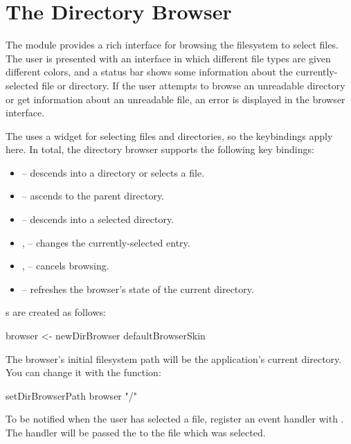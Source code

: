 \section{The Directory Browser}
\label{sec:dirbrowser}

The  module provides a rich interface for browsing the
filesystem to select files.  The user is presented with an interface
in which different file types are given different colors, and a status
bar shows some information about the currently-selected file or
directory.  If the user attempts to browse an unreadable directory or
get information about an unreadable file, an error is displayed in the
browser interface.

The  uses a  widget for selecting files and
directories, so the  keybindings apply here.  In total, the
directory browser supports the following key bindings:

\begin{itemize}
\item {} -- descends into a directory or selects a file.
\item {} -- ascends to the parent directory.
\item {} -- descends into a selected directory.
\item {},  -- changes the currently-selected entry.
\item {},  -- cancels browsing.
\item {} -- refreshes the browser's state of the current
  directory.
\end{itemize}

s are created as follows:

\begin{haskellcode}
 browser <- newDirBrowser defaultBrowserSkin
\end{haskellcode}

The browser's initial filesystem path will be the application's
current directory.  You can change it with the 
function:

\begin{haskellcode}
 setDirBrowserPath browser "/"
\end{haskellcode}

To be notified when the user has selected a file, register an event
handler with .  The handler will be passed the
 to the file which was selected.

